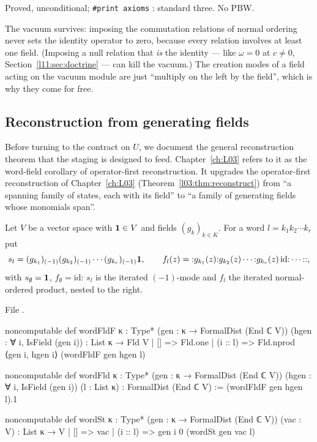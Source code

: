 \begin{status}
Proved, unconditional; \texttt{\#print axioms} \allowbreak{}\allowbreak{}\allowbreak{}\allowbreak{}\allowbreak{}: standard three. No PBW.
\end{status}

\begin{physics}
The vacuum survives: imposing the commutation relations of normal ordering never sets the identity operator to zero,
because every relation involves at least one field. (Imposing a null relation that \emph{is} the identity --- like
$\omega = 0$ at $c\neq0$, Section~\ref{l11:sec:doctrine} --- can kill the vacuum.) The creation modes of a field acting on the
vacuum module are just ``multiply on the left by the field'', which is why they come for free.
\end{physics}

\subsection{Reconstruction from generating fields}

Before turning to the contract on $U$, we document the general reconstruction theorem that the staging is designed to
feed. Chapter~\ref{ch:L03} refers to it as the word-field corollary of operator-first reconstruction. It upgrades the operator-first
reconstruction of Chapter~\ref{ch:L03} (Theorem~\ref{l03:thm:reconstruct}) from ``a spanning family of states, each with its
field'' to ``a family of generating fields whose monomials span''.

\begin{definition}\label{l11:def:wordfld}
Let $V$ be a vector space with $\mathbf{1}\in V$ and fields $(g_k)_{k\in K}$. For a word $l = k_1k_2\cdots k_r$ put
\begin{equation*}
s_l = (g_{k_1})_{(-1)}(g_{k_2})_{(-1)}\cdots(g_{k_r})_{(-1)}\mathbf{1},\qquad
f_l(z) = {:}g_{k_1}(z){:}g_{k_2}(z)\cdots{:}g_{k_r}(z)\,\mathrm{id}{:}\cdots{:}{:},
\end{equation*}
with $s_\emptyset = \mathbf{1}$, $f_\emptyset = \mathrm{id}$: $s_l$ is the iterated $(-1)$-mode and $f_l$ the iterated normal-ordered
product, nested to the right.
\end{definition}
\noindent File .
\begin{leancode}
noncomputable def wordFldF {κ : Type*} (gen : κ → FormalDist (End ℂ V))
    (hgen : ∀ i, IsField (gen i)) : List κ → Fld V
  | [] => Fld.one
  | (i :: l) => Fld.nprod ⟨gen i, hgen i⟩ (wordFldF gen hgen l)

noncomputable def wordFld {κ : Type*} (gen : κ → FormalDist (End ℂ V))
    (hgen : ∀ i, IsField (gen i)) (l : List κ) : FormalDist (End ℂ V) :=
  (wordFldF gen hgen l).1

noncomputable def wordSt {κ : Type*} (gen : κ → FormalDist (End ℂ V)) (vac : V) : List κ → V
  | [] => vac
  | (i :: l) => gen i 0 (wordSt gen vac l)
\end{leancode}

